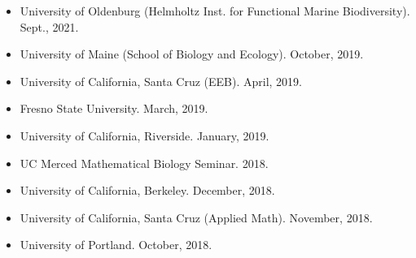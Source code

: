 \documentclass[margin,line,12pt]{res}
\begin{document}
\begin{resume}
\begin{itemize}
\item University of Oldenburg (Helmholtz Inst. for Functional Marine Biodiversity). Sept., 2021.

\item University of Maine (School of Biology and Ecology). October, 2019.

\item University of California, Santa Cruz (EEB). April, 2019.

\item Fresno State University. March, 2019.

\item University of California, Riverside. January, 2019.

\item UC Merced Mathematical Biology Seminar. 2018.

\item University of California, Berkeley. December, 2018.

\item University of California, Santa Cruz (Applied Math). November, 2018.

\item University of Portland. October, 2018.


\end{itemize}
\end{resume}
\end{document}
